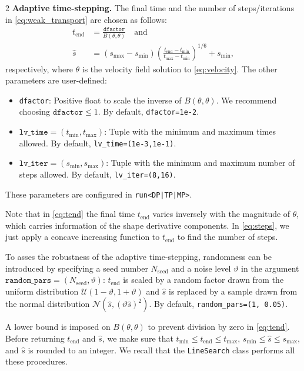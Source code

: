 \documentclass[a4paper, oneside]{article}
\newcommand{\tred}{\textcolor{red}}
\newcommand{\code}[1]{\texttt{#1}}
\begin{document}
\begin{multicols}{2}
\vspace*{0.5cm}
\noindent\textbf{Adaptive time-stepping.} 
The final time and the number of steps/iterations in \eqref{eq:weak_transport}
are chosen as follows:
\begin{align}
    t_{\text{end}}  & = \tfrac{\code{dfactor}}{B(\theta, \theta)}\quad\text{and} \label{eq:tend} \\
    \hat{s} & =
	(s_{\max} - s_{\min}) \left( \tfrac{t_{\text{end}} - t_{\min}}{t_{\max} - t_{\min}} \right)^{1/6}
	+ s_{\min}, \label{eq:steps}
\end{align}
respectively, where
$\theta$ is the velocity field solution to \eqref{eq:velocity}.
The other parameters are user-defined:
\begin{itemize}[left=0.0em]
	\item \code{dfactor}:
	Positive float to scale the inverse of $B(\theta, \theta)$.
	We recommend choosing $\code{dfactor}\leq1$.
	By default, \code{dfactor=1e-2}.
	\item $\code{lv\_time} = (t_{\min}, t_{\max})$:
	Tuple with the minimum and maximum times allowed.
	By default, \code{lv\_time=(1e-3,1e-1)}.
	\item $\code{lv\_iter} = (s_{\min}, s_{\max})$:
	Tuple with the minimum and maximum number of steps allowed.
	By default, \code{lv\_iter=(8,16)}.
\end{itemize}
These parameters are configured in \code{run<DP|TP|MP>}.

Note that in \eqref{eq:tend} the final time $t_{\text{end}}$
varies inversely with the magnitude of $\theta$,
which carries information of the shape derivative components.
In \eqref{eq:steps}, we just apply a concave increasing function
to $t_{\text{end}}$ to find the number of steps.

To asses the robustness of the adaptive time-stepping,
randomness can be introduced by specifying
a seed number $N_\mathrm{seed}$ and a noise level $\vartheta$ in the argument
$\code{random\_pars} = (N_\mathrm{seed}, \vartheta)$:
$t_{\text{end}}$ is scaled by a random factor drawn from the uniform distribution
$\mathcal{U}(1 - \vartheta, 1 + \vartheta)$
and $\hat{s}$ is replaced by a sample drawn from the normal distribution
$\mathcal{N}(\hat{s}, (\vartheta \hat{s})^2)$.
By default, \code{random\_pars=(1, 0.05)}.

A lower bound is imposed on $B(\theta, \theta)$
to prevent division by zero in \eqref{eq:tend}.
Before returning $t_{\text{end}}$ and $\hat{s}$, we make sure that
$t_{\min}\leq t_{\text{end}} \leq t_{\max}$, $s_{\min}\leq \hat{s} \leq s_{\max}$,
and $\hat{s}$ is rounded to an integer.
We recall that the \code{LineSearch} class 
performs all these procedures.


\end{multicols}
\end{document}
